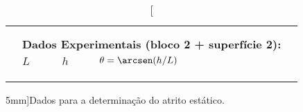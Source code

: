 \begin{table}[!ht]
\begin{tabular}{lp{28mm}p{28mm}p{28mm}l}
	& \cellcolor[gray]{0.89} & \cellcolor[gray]{0.92} & \cellcolor[gray]{0.89} \\	
	\cmidrule{2-4}
    \\
	&\multicolumn{3}{l}{\textbf{Dados Experimentais (bloco 2 + superfície 2):}} \\
	\cmidrule{2-4}
	& $L$ & $h$ & $\theta = \arcsen (h/L)$ & \\
	\cmidrule{2-4}
	& \cellcolor[gray]{0.89} & \cellcolor[gray]{0.92} & \cellcolor[gray]{0.89} \\
	& \cellcolor[gray]{0.95} & \cellcolor[gray]{0.97} & \cellcolor[gray]{0.95} \\
	& \cellcolor[gray]{0.89} & \cellcolor[gray]{0.92} & \cellcolor[gray]{0.89} \\	
	\cmidrule{2-4}

\bottomrule
\end{tabular}
\caption[][5mm]{Dados para a determinação do atrito estático.}
\label{DadosAtritoEstatico}
\end{table}

\pagebreak

